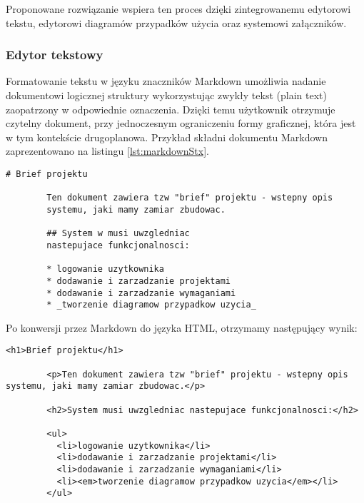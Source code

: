       Proponowane rozwiązanie wspiera ten proces dzięki zintegrowanemu edytorowi tekstu, edytorowi diagramów przypadków użycia oraz systemowi załączników.
      

      \subsubsection{Edytor tekstowy}

      Formatowanie tekstu w języku znaczników Markdown \cite{Grub04} umożliwia nadanie dokumentowi logicznej struktury wykorzystując zwykły tekst (plain text) zaopatrzony w odpowiednie oznaczenia. Dzięki temu użytkownik otrzymuje czytelny dokument, przy jednoczesnym ograniczeniu formy graficznej, która jest w tym kontekście drugoplanowa. Przykład składni dokumentu Markdown zaprezentowano na listingu \ref{lst:markdownStx}.

      \begin{lstlisting}[caption={przykład składni języka Markdown}, label={lst:markdownStx}]
        # Brief projektu

        Ten dokument zawiera tzw "brief" projektu - wstepny opis 
        systemu, jaki mamy zamiar zbudowac.

        ## System w musi uwzgledniac 
        nastepujace funkcjonalnosci:
       
        * logowanie uzytkownika
        * dodawanie i zarzadzanie projektami
        * dodawanie i zarzadzanie wymaganiami
        * _tworzenie diagramow przypadkow uzycia_
      \end{lstlisting}
      
      Po konwersji przez Markdown do języka HTML, otrzymamy następujący wynik:

      \begin{lstlisting}[caption={wynik konwersji powyższego kodu do HTML}, label={lst:markDownCompile}]
        <h1>Brief projektu</h1>

        <p>Ten dokument zawiera tzw "brief" projektu - wstepny opis systemu, jaki mamy zamiar zbudowac.</p>

        <h2>System musi uwzgledniac nastepujace funkcjonalnosci:</h2>

        <ul>
          <li>logowanie uzytkownika</li>
          <li>dodawanie i zarzadzanie projektami</li>
          <li>dodawanie i zarzadzanie wymaganiami</li>
          <li><em>tworzenie diagramow przypadkow uzycia</em></li>
        </ul>
      \end{lstlisting}
  
